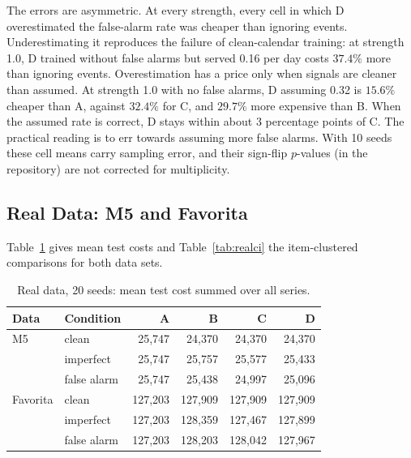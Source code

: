The errors are asymmetric. At every strength, every cell in which D overestimated the false-alarm rate was cheaper than ignoring events. Underestimating it reproduces the failure of clean-calendar training: at strength 1.0, D trained without false alarms but served 0.16 per day costs $37.4\%$ more than ignoring events. Overestimation has a price only when signals are cleaner than assumed. At strength 1.0 with no false alarms, D assuming 0.32 is $15.6\%$ cheaper than A, against $32.4\%$ for C, and $29.7\%$ more expensive than B. When the assumed rate is correct, D stays within about 3 percentage points of C. The practical reading is to err towards assuming more false alarms. With 10 seeds these cell means carry sampling error, and their sign-flip $p$-values (in the repository) are not corrected for multiplicity.

\subsection{Real Data: M5 and Favorita}
Table~\ref{tab:realcost} gives mean test costs and Table~\ref{tab:realci} the item-clustered comparisons for both data sets.

\begin{table}[t]
\centering
\caption{Real data, 20 seeds: mean test cost summed over all series.}
\label{tab:realcost}
\setlength{\tabcolsep}{3pt}
\footnotesize
\begin{tabular}{@{}llrrrr@{}}
\toprule
\textbf{Data} & \textbf{Condition} & \textbf{A} & \textbf{B} & \textbf{C} & \textbf{D} \\
\midrule
M5       & clean       & 25{,}747 & 24{,}370 & 24{,}370 & 24{,}370 \\
         & imperfect   & 25{,}747 & 25{,}757 & 25{,}577 & 25{,}433 \\
         & false alarm & 25{,}747 & 25{,}438 & 24{,}997 & 25{,}096 \\
\midrule
Favorita & clean       & 127{,}203 & 127{,}909 & 127{,}909 & 127{,}909 \\
         & imperfect   & 127{,}203 & 128{,}359 & 127{,}467 & 127{,}899 \\
         & false alarm & 127{,}203 & 128{,}203 & 128{,}042 & 127{,}967 \\
\bottomrule
\end{tabular}
\end{table}

